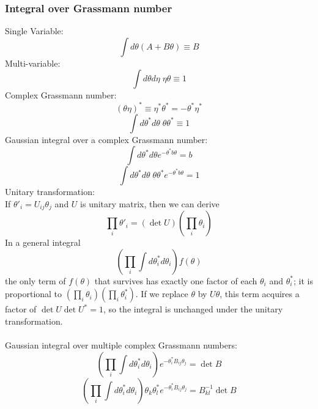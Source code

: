 \subsubsection{Integral over Grassmann number}
\noindent
Single Variable:
\[\int d\theta (A + B\theta) \equiv B\]
Multi-variable:
\[\int d\theta d\eta \; \eta \theta \equiv 1\]
Complex Grassmann number:
\[(\theta \eta)^* \equiv \eta^* \theta^* = -\theta^* \eta^*\]
\[\int d\theta^* d\theta \; \theta \theta^* \equiv 1\]
Gaussian integral over a complex Grassmann number:
\[\int d\theta^* d\theta e^{-\theta^* b \theta} = b\]
\[\int d\theta^* d\theta \; \theta \theta^* e^{-\theta^* b \theta}  = 1\]
Unitary transformation:\\
If $\theta'_i = U_{ij}\theta_j$ and $U$ is unitary matrix, then we can derive
\[\prod_i \theta'_i = (\det U) (\prod_i \theta_i)\]
In a general integral
\[(\prod_i \int d\theta^*_i d\theta_i) f(\theta)\]
the only term of $f(\theta)$ that survives has exactly one factor of each $\theta_i$ and $\theta^*_i$; it is proportional to $(\prod_i \theta_i)(\prod_i \theta^*_i)$. If we replace $\theta$ by $U\theta$, this term acquires a factor of $\det U \det U^* = 1$, so the integral is unchanged under the unitary transformation.\\ \\
Gaussian integral over multiple complex Grassmann numbers:
\[(\prod_i \int d\theta^*_i d\theta_i) e^{-\theta^*_i B_{ij}\theta_j} = \det B\]
\[(\prod_i \int d\theta^*_i d\theta_i) \theta_k \theta^*_l e^{-\theta^*_i B_{ij}\theta_j} =B^{-1}_{kl} \det B\]

